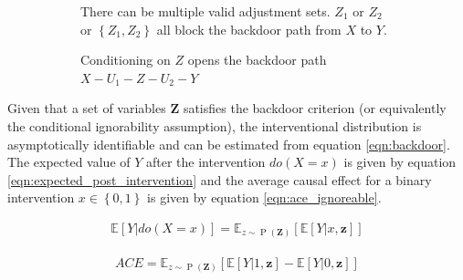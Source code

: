 \documentclass[11pt,a4paper,oneside]{book}
\newcommand{\vb}[1]{\boldsymbol{#1}}
\newcommand{\Esub}[2]{\mathbb E_{#1}\left[{#2}\right]}
\newcommand{\E}[1]{\mathbb E\left[{#1}\right]}
\newcommand{\set}[1]{\left\{#1\right\}}
\newcommand{\eqn}[1]{\begin{align}#1\end{align}}
\renewcommand{\P}[1]{\operatorname{P}\left(#1\right)}
\theoremstyle{plain}
\theoremstyle{definition}
\begin{document}
\begin{figure}
\centering
\begin{subfigure}[t]{0.48\textwidth}
\centering
\caption{There can be multiple valid adjustment sets. $Z_1$ or $Z_2$ or $\set{Z_1,Z_2}$ all block the backdoor path from $X$ to $Y$.}
\label{fig:adjust_multiple}
\end{subfigure}
\begin{subfigure}[t]{0.48\textwidth}
\centering
\caption{Conditioning on $Z$ opens the backdoor path $X-U_1-Z-U_2-Y$}
\label{fig:m-graph}
\end{subfigure}
\caption{}
\label{fig:adjustment}
\end{figure}


Given that a set of variables $\boldsymbol{Z}$ satisfies the backdoor criterion (or equivalently the conditional ignorability assumption), the interventional distribution is asymptotically identifiable and can be estimated from equation \ref{eqn:backdoor}. The expected value of $Y$ after the intervention $do(X=x)$ is given by equation \ref{eqn:expected_post_intervention} and the average causal effect for a binary intervention $x \in \set{0,1}$ is given by equation \ref{eqn:ace_ignoreable}.

\eqn{
\label{eqn:expected_post_intervention}
\E{Y|do(X=x)} = \Esub{z\sim \P{\vb{Z}}}{\E{Y|x,\vb{z}}}
} 

\eqn{
\label{eqn:ace_ignoreable}
ACE = \Esub{z\sim \P{\vb{Z}}}{\E{Y|1,\vb{z}}-\E{Y|0,\vb{z}}}
}  
\end{document}
